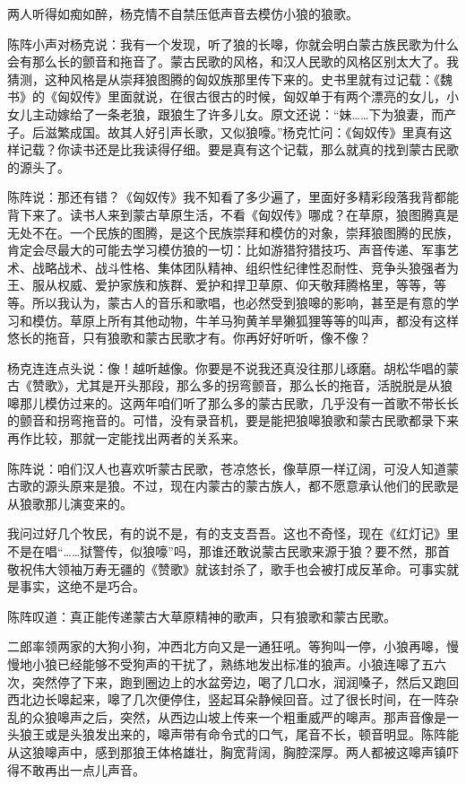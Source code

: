 \par 两人听得如痴如醉，杨克情不自禁压低声音去模仿小狼的狼歌。
\par 陈阵小声对杨克说：我有一个发现，听了狼的长嗥，你就会明白蒙古族民歌为什么会有那么长的颤音和拖音了。蒙古民歌的风格，和汉人民歌的风格区别太大了。我猜测，这种风格是从崇拜狼图腾的匈奴族那里传下来的。史书里就有过记载：《魏书》的《匈奴传》里面就说，在很古很古的时候，匈奴单于有两个漂亮的女儿，小女儿主动嫁给了一条老狼，跟狼生了许多儿女。原文还说：“妹……下为狼妻，而产子。后滋繁成国。故其人好引声长歌，又似狼嚎。”杨克忙问：《匈奴传》里真有这样记载？你读书还是比我读得仔细。要是真有这个记载，那么就真的找到蒙古民歌的源头了。
\par 陈阵说：那还有错？《匈奴传》我不知看了多少遍了，里面好多精彩段落我背都能背下来了。读书人来到蒙古草原生活，不看《匈奴传》哪成？在草原，狼图腾真是无处不在。一个民族的图腾，是这个民族崇拜和模仿的对象，崇拜狼图腾的民族，肯定会尽最大的可能去学习模仿狼的一切：比如游猎狩猎技巧、声音传递、军事艺术、战略战术、战斗性格、集体团队精神、组织性纪律性忍耐性、竞争头狼强者为王、服从权威、爱护家族和族群、爱护和捍卫草原、仰天敬拜腾格里，等等，等等。所以我认为，蒙古人的音乐和歌唱，也必然受到狼嗥的影响，甚至是有意的学习和模仿。草原上所有其他动物，牛羊马狗黄羊旱獭狐狸等等的叫声，都没有这样悠长的拖音，只有狼歌和蒙古民歌才有。你再好好听听，像不像？
\par 杨克连连点头说：像！越听越像。你要是不说我还真没往那儿琢磨。胡松华唱的蒙古《赞歌》，尤其是开头那段，那么多的拐弯颤音，那么长的拖音，活脱脱是从狼嗥那儿模仿过来的。这两年咱们听了那么多的蒙古民歌，几乎没有一首歌不带长长的颤音和拐弯拖音的。可惜，没有录音机，要是能把狼嗥狼歌和蒙古民歌都录下来再作比较，那就一定能找出两者的关系来。
\par 陈阵说：咱们汉人也喜欢听蒙古民歌，苍凉悠长，像草原一样辽阔，可没人知道蒙古歌的源头原来是狼。不过，现在内蒙古的蒙古族人，都不愿意承认他们的民歌是从狼歌那儿演变来的。
\par 我问过好几个牧民，有的说不是，有的支支吾吾。这也不奇怪，现在《红灯记》里不是在唱“……狱警传，似狼嚎”吗，那谁还敢说蒙古民歌来源于狼？要不然，那首敬祝伟大领袖万寿无疆的《赞歌》就该封杀了，歌手也会被打成反革命。可事实就是事实，这绝不是巧合。
\par 陈阵叹道：真正能传递蒙古大草原精神的歌声，只有狼歌和蒙古民歌。
\par 
\par 二郎率领两家的大狗小狗，冲西北方向又是一通狂吼。等狗叫一停，小狼再嗥，慢慢地小狼已经能够不受狗声的干扰了，熟练地发出标准的狼声。小狼连嗥了五六次，突然停了下来，跑到圈边上的水盆旁边，喝了几口水，润润嗓子，然后又跑回西北边长嗥起来，嗥了几次便停住，竖起耳朵静候回音。过了很长时间，在一阵杂乱的众狼嗥声之后，突然，从西边山坡上传来一个粗重威严的嗥声。那声音像是一头狼王或是头狼发出来的，嗥声带有命令式的口气，尾音不长，顿音明显。陈阵能从这狼嗥声中，感到那狼王体格雄壮，胸宽背阔，胸腔深厚。两人都被这嗥声镇吓得不敢再出一点儿声音。
